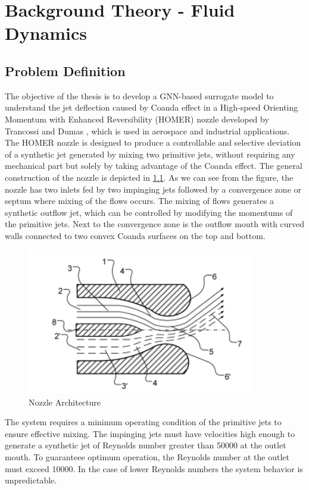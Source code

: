 \chapter{Background Theory - Fluid Dynamics}
\label{chap:Theory-CFD}
\section{Problem Definition}
The objective of the thesis is to develop a GNN-based surrogate model to understand the jet deflection caused by Coanda effect in a High-speed Orienting Momentum with Enhanced Reversibility (HOMER) nozzle developed by Trancossi and Dumas \cite{trandum}, which is used in aerospace and industrial applications. The HOMER nozzle is designed to produce a controllable and selective deviation of a synthetic jet generated by mixing two primitive jets, without requiring any mechanical part but solely by taking advantage of the Coanda effect. The general construction of the nozzle is depicted in \ref{fig:nozzle}. As we can see from the figure, the nozzle has two inlets fed by two impinging jets followed by a convergence zone or septum where mixing of the flows occurs. The mixing of flows generates a synthetic outflow jet, which can be controlled by modifying the momentums of the primitive jets. Next to the convergence zone is the outflow mouth with curved walls connected to two convex Coanda surfaces on the top and bottom.
\begin{figure}[ht]
  \centering
  \includegraphics[width=10cm]{images/Theory-CFD/nozzle.png}
  \caption{Nozzle Architecture}
  \label{fig:nozzle}
\end{figure}
The system requires a minimum operating condition of the primitive jets to ensure effective mixing. The impinging jets must have velocities high enough to generate a synthetic jet of Reynolds number greater than 50000 at the outlet mouth. To guaranteee optimum operation, the Reynolds number at the outlet must exceed 10000. In the case of lower Reynolds numbers the system behavior is unpredictable. 
